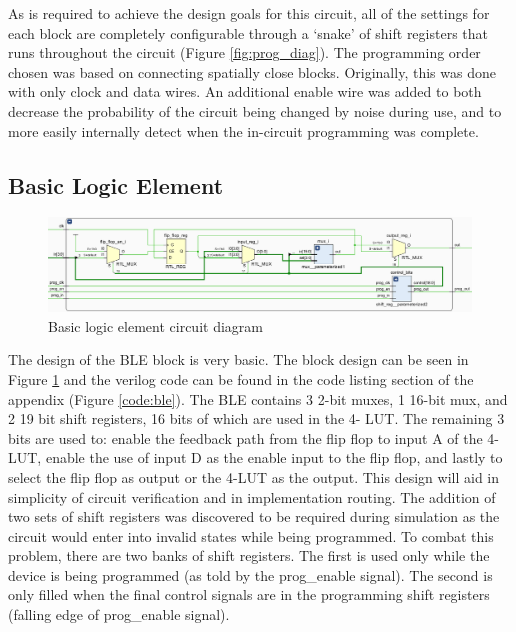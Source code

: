 \documentclass[12pt]{article}
\begin{document}
As is required to achieve the design goals for this circuit, all of the settings for
each block are completely configurable through a ‘snake’ of shift registers that runs throughout 
the circuit (Figure \ref{fig:prog_diag}). The programming order chosen was based on connecting
spatially close blocks. Originally, this was done with only clock and data
wires. An additional enable wire was added to both decrease the probability of the circuit
being changed by noise during use, and to more easily internally detect when the
in-circuit programming was complete.

\subsection{Basic Logic Element}

\begin{figure}[ht]
    \centering
    \includegraphics[width=\textwidth]{ble}
    \caption{Basic logic element circuit diagram}
    \label{fig:ble}
\end{figure}

The design of the BLE block is very basic. The block design can be seen in Figure 
\ref{fig:ble} and the verilog code can be found in the code listing section of the
appendix (Figure \ref{code:ble}). The BLE contains 3 2-bit muxes,
1 16-bit mux, and 2 19 bit shift registers, 16 bits of which are used in the 4-
LUT. The remaining 3 bits are used to: enable the feedback path from the flip flop 
to input A of the 4-LUT, enable the use of input D as the enable input to the flip 
flop, and lastly to select the flip flop as output or the 4-LUT as the output. This 
design will aid in simplicity of circuit verification and in implementation routing.
The addition of two sets of shift registers was discovered to be required during 
simulation as the circuit would enter into invalid states while being programmed. 
To combat this problem, there are two banks of shift registers. The first is used 
only while the device is being programmed (as told by the prog{\_}enable signal). The 
second is only filled when the final control signals are in the programming shift 
registers (falling edge of prog{\_}enable signal).
\end{document}
